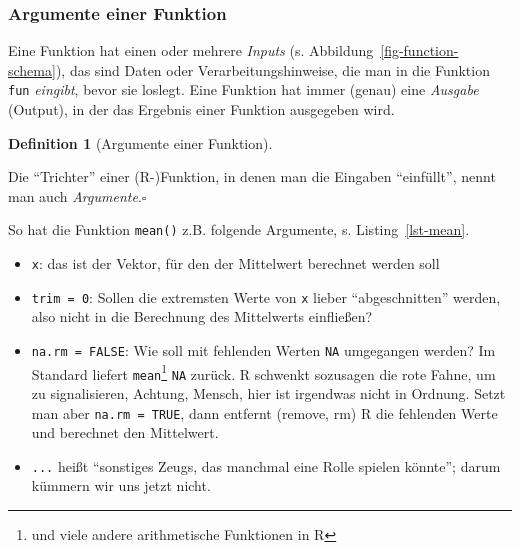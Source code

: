 \documentclass[
  a4paper,
  DIV=11]{scrreprt}
\newenvironment{Shaded}{\begin{snugshade}}{\end{snugshade}}
\newcommand{\AttributeTok}[1]{\textcolor[rgb]{0.40,0.45,0.13}{#1}}
\newcommand{\ConstantTok}[1]{\textcolor[rgb]{0.56,0.35,0.01}{#1}}
\newcommand{\DecValTok}[1]{\textcolor[rgb]{0.68,0.00,0.00}{#1}}
\newcommand{\FunctionTok}[1]{\textcolor[rgb]{0.28,0.35,0.67}{#1}}
\newcommand{\NormalTok}[1]{\textcolor[rgb]{0.00,0.23,0.31}{#1}}
\providecommand{\tightlist}{%
  \setlength{\itemsep}{0pt}\setlength{\parskip}{0pt}}\usepackage{longtable,booktabs,array}
\theoremstyle{definition}
\theoremstyle{definition}
\theoremstyle{definition}
\newtheorem{definition}{Definition}[chapter]
\theoremstyle{remark}
\begin{document}
\subsubsection{Argumente einer Funktion}\label{argumente-einer-funktion}

Eine Funktion hat einen oder mehrere \emph{Inputs} (s.
Abbildung~\ref{fig-function-schema}), das sind Daten oder
Verarbeitungshinweise, die man in die Funktion \texttt{fun}
\emph{eingibt}, bevor sie loslegt. Eine Funktion hat immer (genau) eine
\emph{Ausgabe} (Output), in der das Ergebnis einer Funktion ausgegeben
wird.

\begin{definition}[Argumente einer
Funktion]\protect\hypertarget{def-args}{}\label{def-args}

Die ``Trichter'' einer (R-)Funktion, in denen man die Eingaben
``einfüllt'', nennt man auch \emph{Argumente}.\(\square\)

\end{definition}

So hat die Funktion \texttt{mean()} z.B. folgende Argumente, s.
Listing~\ref{lst-mean}.

\begin{codelisting}

\caption{\label{lst-mean}Die Argumente der R-Funktion \texttt{mean}}

\centering{

\begin{Shaded}
\begin{Highlighting}[]
\FunctionTok{mean}\NormalTok{(x, }\AttributeTok{trim =} \DecValTok{0}\NormalTok{, }\AttributeTok{na.rm =} \ConstantTok{FALSE}\NormalTok{, ...)}
\end{Highlighting}
\end{Shaded}

}

\end{codelisting}%

\begin{itemize}
\tightlist
\item
  \texttt{x}: das ist der Vektor, für den der Mittelwert berechnet
  werden soll
\item
  \texttt{trim\ =\ 0}: Sollen die extremsten Werte von \texttt{x} lieber
  ``abgeschnitten'' werden, also nicht in die Berechnung des Mittelwerts
  einfließen?
\item
  \texttt{na.rm\ =\ FALSE}: Wie soll mit fehlenden Werten \texttt{NA}
  umgegangen werden? Im Standard liefert \texttt{mean}\footnote{und
    viele andere arithmetische Funktionen in R} \texttt{NA} zurück. R
  schwenkt sozusagen die rote Fahne, um zu signalisieren, Achtung,
  Mensch, hier ist irgendwas nicht in Ordnung. Setzt man aber
  \texttt{na.rm\ =\ TRUE}, dann entfernt (remove, rm) R die fehlenden
  Werte und berechnet den Mittelwert.
\item
  \texttt{...} heißt ``sonstiges Zeugs, das manchmal eine Rolle spielen
  könnte''; darum kümmern wir uns jetzt nicht.
\end{itemize}
\end{document}

